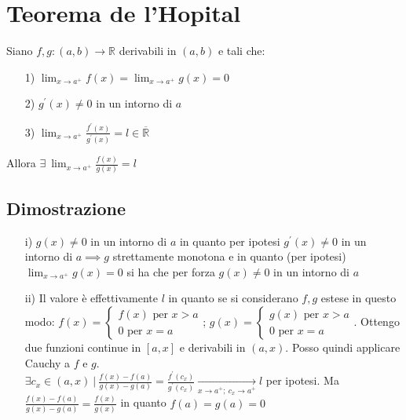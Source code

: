 \section{Teorema de l'Hopital}
Siano $f,g: (a,b) \to \mathbb{R}$ derivabili in $(a,b)$ e tali che:
\begin{enumerate}
\item[1)] $\displaystyle \lim_{x \to a^+}f(x) = \lim_{x \to a^+}g(x) = 0$
\item[2)] $g^{\prime}(x) \neq 0$ in un intorno di $a$
\item[3)] $\displaystyle \lim_{x \to a^+}\frac{f^{\prime}(x)}{g^{\prime}(x)} = l \in \mathbb{\overline{R}}$
\end{enumerate}
Allora $\exists\ \displaystyle \lim_{x \to a^+}\frac{f(x)}{g(x)} = l$
\subsection{Dimostrazione}
\begin{enumerate}
\item[i)] $g(x) \neq 0$ in un intorno di $a$ in quanto per ipotesi $g^{\prime}(x) \neq 0$ in un intorno di $a \implies g$ strettamente monotona e in quanto (per ipotesi) $\displaystyle \lim_{x \to a^+}g(x) = 0$ si ha che per forza $g(x) \neq 0$ in un intorno di $a$
\item[ii)] Il valore è effettivamente $l$ in quanto se si considerano $f,g$ estese in questo modo:
$f(x) = \begin{cases}
f(x) \text{ per } x>a\\
0 \text{ per } x=a
\end{cases}$;
$g(x) = \begin{cases}
g(x) \text{ per } x>a\\
0 \text{ per } x=a
\end{cases}$. Ottengo due funzioni continue in $[a,x]$ e derivabili in $(a,x)$. Posso quindi applicare Cauchy a $f$ e $g$.\\
$\exists c_x \in (a,x)\ |\ \frac{f(x) - f(a)}{g(x) - g(a)} = \frac{f^{\prime}(c_x)}{g^{\prime}(c_x)} \xrightarrow[x \to a^+;\ c_x \to a^+]{} l$ per ipotesi. Ma $\frac{f(x) - f(a)}{g(x) - g(a)} = \frac{f(x)}{g(x)}$ in quanto $f(a) = g(a) = 0$
\end{enumerate}
